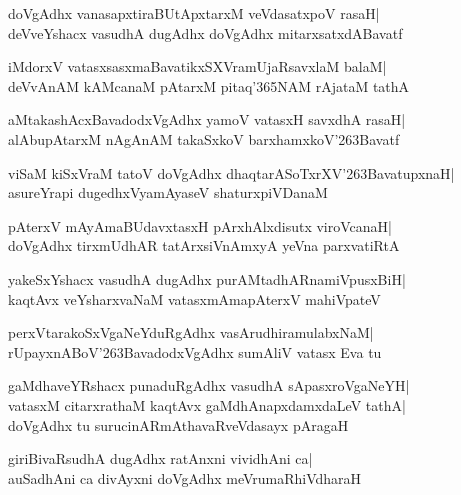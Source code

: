 \documentclass[twoside,12pt,openright]{book}
\def\S{\char'263}
\newcounter{shloka}[chapter]
\begin{document}
\begin{shloka}%
doVgAdhx vanasapxtiraBUtApxtarxM veVdasatxpoV rasaH|\\
deVveYshacx vasudhA dugAdhx doVgAdhx mitarxsatxdABavatf
\end{shloka}

\begin{shloka}%
iMdorxV vatasxsasxmaBavatikxSXVramUjaRsavxlaM balaM|\\
deVvAnAM kAMcanaM pAtarxM pitaq\char'365NAM rAjataM tathA
\end{shloka}

\begin{shloka}%
aMtakashAcxBavadodxVgAdhx yamoV vatasxH savxdhA rasaH|\\
alAbupAtarxM nAgAnAM takaSxkoV barxhamxkoV\S Bavatf
\end{shloka}

\begin{shloka}%
viSaM kiSxVraM tatoV doVgAdhx dhaqtarASoTxrXV\S BavatupxnaH|\\
asureYrapi dugedhxVyamAyaseV shaturxpiVDanaM
\end{shloka}

\begin{shloka}%
pAterxV mAyAmaBUdavxtasxH pArxhAlxdisutx viroVcanaH|\\
doVgAdhx tirxmUdhAR tatArxsiVnAmxyA yeVna parxvatiRtA
\end{shloka}

\begin{shloka}%
yakeSxYshacx vasudhA dugAdhx purAMtadhARnamiVpusxBiH|\\
kaqtAvx veYsharxvaNaM vatasxmAmapAterxV mahiVpateV
\end{shloka}

\begin{shloka}%
perxVtarakoSxVgaNeYduRgAdhx vasArudhiramulabxNaM|\\
rUpayxnABoV\S BavadodxVgAdhx sumAliV vatasx Eva tu
\end{shloka}

\begin{shloka}%
gaMdhaveYRshacx punaduRgAdhx vasudhA sApasxroVgaNeYH|\\
vatasxM citarxrathaM kaqtAvx gaMdhAnapxdamxdaLeV tathA|\\
doVgAdhx tu surucinARmAthavaRveVdasayx pAragaH
\end{shloka}

\begin{shloka}%
giriBivaRsudhA dugAdhx ratAnxni vividhAni ca|\\
auSadhAni ca divAyxni doVgAdhx meVrumaRhiVdharaH
\end{shloka}
\end{document}

